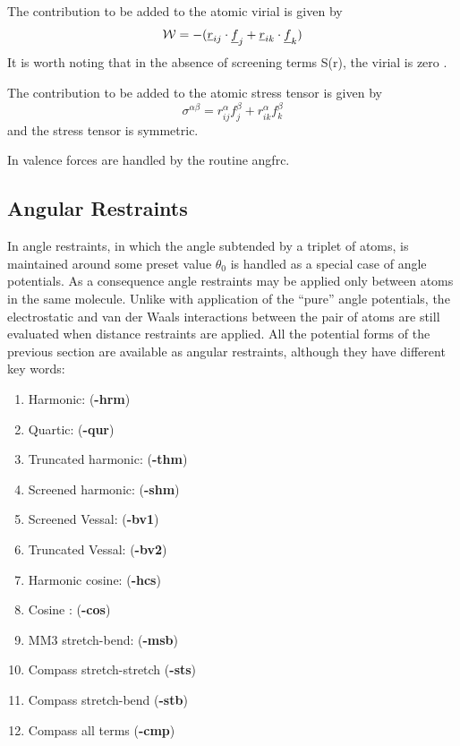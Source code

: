 The contribution to be added to the atomic virial is given by
\begin{equation}
{\cal W}=-(\mbox{$\underline{r}$}_{ij}\cdot\mbox{$\underline{f}$}_{j}+\mbox{$\underline{r}$}_{ik}\cdot\mbox{$\underline{f}$}_{k})
\end{equation}
It is worth noting that in the absence of screening terms S(r), the
virial is zero \cite{smith-93c}.

The contribution to be added to the atomic stress tensor is given by
\begin{equation}
\sigma^{\alpha \beta}=r_{ij}^{\alpha}f_{j}^{\beta}+
r_{ik}^{\alpha}f_{k}^{\beta}
\end{equation}
and the stress tensor is symmetric.

In \D{} valence forces are handled by the routine {\sc
angfrc}.

\subsection{Angular Restraints}

In \D{} angle restraints, in which the angle subtended by a triplet of
atoms, is maintained around some preset value $\theta_0$ is handled as
a special case of angle potentials. As a consequence angle restraints
may be applied only between atoms in the same molecule.  Unlike with
application of the ``pure'' angle potentials, the electrostatic and
van der Waals interactions between the pair of atoms are still
evaluated when distance restraints are applied.  All the potential
forms of the previous section are available as angular restraints,
although they have different key words:

\begin{enumerate}
\item Harmonic:  ({\bf -hrm})
\item Quartic:  ({\bf -qur})
\item Truncated harmonic:  ({\bf -thm})
\item Screened harmonic:  ({\bf -shm})
\item Screened Vessal\cite{vessal-94a}:  ({\bf -bv1})
\item Truncated Vessal\cite{smith-95a}: ({\bf -bv2})
\item Harmonic cosine: ({\bf -hcs})
\item Cosine : ({\bf -cos})
\item MM3 stretch-bend: ({\bf -msb})
\item Compass stretch-stretch ({\bf -sts})
\item Compass stretch-bend ({\bf -stb})
\item Compass all terms ({\bf -cmp})
\end{enumerate}

